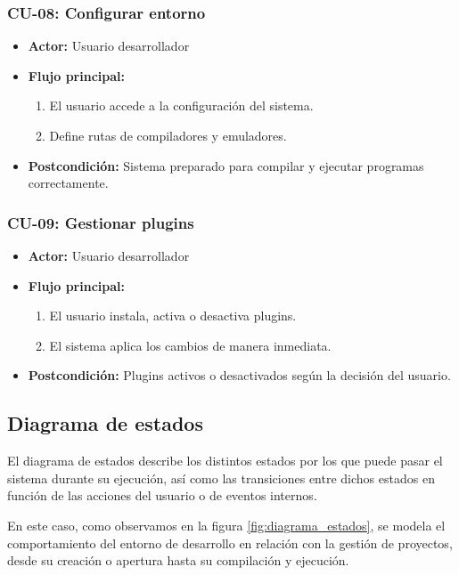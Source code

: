 \documentclass[../../main.tex]{subfiles}
\begin{document}
\subsubsection*{CU-08: Configurar entorno}
\begin{itemize}
    \item \textbf{Actor:} Usuario desarrollador
    \item \textbf{Flujo principal:}
        \begin{enumerate}
            \item El usuario accede a la configuración del sistema.
            \item Define rutas de compiladores y emuladores.
        \end{enumerate}
    \item \textbf{Postcondición:} Sistema preparado para compilar y ejecutar programas correctamente.
\end{itemize}

\subsubsection*{CU-09: Gestionar plugins}
\begin{itemize}
    \item \textbf{Actor:} Usuario desarrollador
    \item \textbf{Flujo principal:}
        \begin{enumerate}
            \item El usuario instala, activa o desactiva plugins.
            \item El sistema aplica los cambios de manera inmediata.
        \end{enumerate}
    \item \textbf{Postcondición:} Plugins activos o desactivados según la decisión del usuario.
\end{itemize}

\clearpage

\subsection{Diagrama de estados}

\par{El diagrama de estados describe los distintos estados por los que puede pasar el sistema durante su ejecución, así como las transiciones entre dichos estados en función de las acciones del usuario o de eventos internos.}

\par{En este caso, como observamos en la figura \ref{fig:diagrama_estados}, se modela el comportamiento del entorno de desarrollo en relación con la gestión de proyectos, desde su creación o apertura hasta su compilación y ejecución.}
\end{document}
